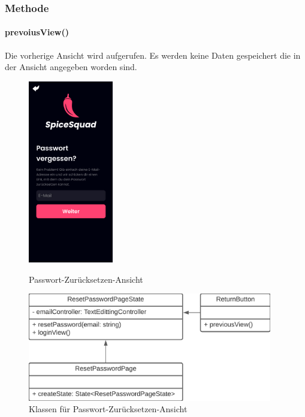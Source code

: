 \documentclass[parskip=full]{scrartcl}
\begin{document}
\subsubsection*{Methode}
\paragraph*{prevoiusView()} Die vorherige Ansicht wird aufgerufen. Es werden keine Daten gespeichert die in der Ansicht angegeben worden sind.

\begin{figure}[htp]
    \begin{minipage}
        [t]{0.49\textwidth}
        \centering
        \includegraphics[height=80mm]{images/Presentation-layer/PasswordResetView.jpg}
        \caption{Passwort-Zurücksetzen-Ansicht}
    \end{minipage}
    \begin{minipage}
        [t]{0.49\textwidth}
        \centering
        \includegraphics[width=0.95\textwidth]{images/Presentation-layer/PasswordResetViewClass.png}
        \caption{Klassen für Passwort-Zurücksetzen-Ansicht}
    \end{minipage}
\end{figure}
\end{document}
